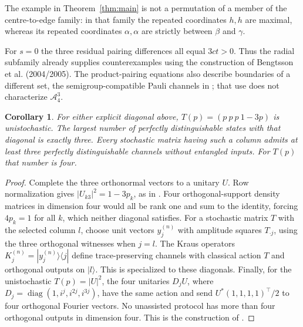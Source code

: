 \documentclass[11pt]{article}
\newtheorem{corollary}[theorem]{Corollary}
\newcommand{\A}{\mathcal A}
\begin{document}
The example in Theorem~\ref{thm:main} is not a permutation of a member
of the centre-to-edge family: in that family the repeated coordinates $h,h$
are maximal, whereas its repeated coordinates $\alpha,\alpha$ are strictly
between $\beta$ and $\gamma$.

For $s=0$ the three residual pairing differences all equal
$3ct>0$. Thus the radial subfamily already supplies counterexamples
using the construction of Bengtsson et al. (2004/2005).
The product-pairing equations also describe boundaries of a different
set, the semigroup-compatible Pauli channels in
\cite[Section IV, Eq. (23)]{PRZ}; that use does not characterize $\A_4^3$.

\begin{corollary}\label{cor:unitary}
For either explicit diagonal above, $T(p)=(p\ p\ p\ 1-3p)$ is
unistochastic. The largest number of perfectly distinguishable states with
that diagonal is exactly three. Every stochastic matrix having such a
column admits at least three perfectly distinguishable channels without
entangled inputs. For $T(p)$ that number is four.
\end{corollary}
\begin{proof}
Complete the three orthonormal vectors to a unitary $U$. Row normalization
gives $|U_{k3}|^2=1-3p_k$, as in \cite[Lemma 5]{KCPZ}.
Four orthogonal-support density matrices in dimension four would all be
rank one and sum to the identity, forcing $4p_k=1$ for all $k$, which neither
diagonal satisfies.
For a stochastic matrix $T$ with the selected column $l$, choose unit vectors
$y_j^{(n)}$ with amplitude squares $T_{\cdot j}$, using the three orthogonal
witnesses when $j=l$. The Kraus operators
$K_j^{(n)}=|y_j^{(n)}\rangle\langle j|$ define trace-preserving channels
with classical action $T$ and orthogonal outputs on $|l\rangle$.
This is \cite[Proposition 19]{KCPZ} specialized to these diagonals.
Finally, for the unistochastic $T(p)=|U|^2$, the four unitaries $D_jU$, where
$D_j=\operatorname{diag}(1,i^j,i^{2j},i^{3j})$, have the same action and
send $U^*(1,1,1,1)^\top/2$ to four orthogonal Fourier vectors.
No unassisted protocol has more than four orthogonal outputs in dimension
four. This is the construction of \cite[Proposition 15]{KCPZ}.
\end{proof}
\end{document}
